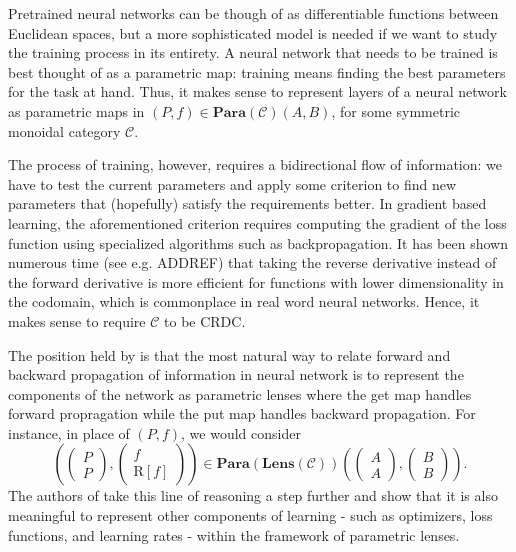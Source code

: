 \documentclass[12pt,a4paper,openright,twoside]{report}
\theoremstyle{plain}
\theoremstyle{definition}
\begin{document}
Pretrained neural networks can be though of as differentiable functions between Euclidean spaces, but a more sophisticated model is needed if we want to study the training process in its entirety. A neural network that needs to be trained is best thought of as a parametric map: training means finding the best parameters for the task at hand. Thus, it makes sense to represent layers of a neural network as parametric maps in $(P,f) \in \mathbf{Para}(\mathcal{C})(A,B)$, for some symmetric monoidal category $\mathcal{C}$.


The process of training, however, requires a bidirectional flow of information: we have to test the current parameters and apply some criterion to find new parameters that (hopefully) satisfy the requirements better. In gradient based learning, the aforementioned criterion requires computing the gradient of the loss function using specialized algorithms such as backpropagation. It has been shown numerous time (see e.g. ADDREF) that taking the reverse derivative instead of the forward derivative is more efficient for functions with lower dimensionality in the codomain, which is commonplace in real word neural networks. Hence, it makes sense to require $\mathcal{C}$ to be CRDC. 

The position held by \cite{cruttwellDeepLearningParametric} is that the most natural way to relate forward and backward propagation of information in neural network is to represent the components of the network as parametric lenses where the get map handles forward propragation while the put map handles backward propagation. For instance,  in place of $(P,f)$, we would consider
\begin{equation}
  \label{eq: exparametriclens}
  \left(\begin{pmatrix} P \\ P \end{pmatrix},\begin{pmatrix} f \\ \mathrm{R}[f] \end{pmatrix}\right) 
  \in \mathbf{Para}(\mathbf{Lens}(\mathcal{C}))
  \left(\begin{pmatrix} A \\ A \end{pmatrix},\begin{pmatrix} B \\ B \end{pmatrix}\right).
\end{equation}
The authors of \cite{cruttwellDeepLearningParametric} take this line of reasoning a step further and show that it is also meaningful to represent other components of learning - such as optimizers, loss functions, and learning rates - within the framework of parametric lenses. 
\end{document}
